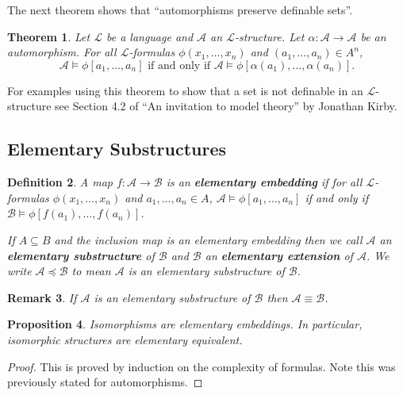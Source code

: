 \documentclass[11pt]{article}
\newtheorem{theorem}{Theorem}[section]
\newtheorem{remark}[theorem]{Remark}
\newtheorem{proposition}[theorem]{Proposition}
\newtheorem{definition}[theorem]{Definition}
\newcommand{\mcal}[1]{\mathcal{#1}}
\begin{document}
The next theorem shows that ``automorphisms preserve definable sets''.

\begin{theorem}
Let $\mcal{L}$ be a language and $\mcal{A}$ an $\mcal{L}$-structure. Let $\alpha:\mcal{A}\rightarrow\mcal{A}$ be an automorphism. For all $\mcal{L}$-formulas $\phi(x_1,\ldots,x_n)$ and $(a_1,\ldots,a_n)\in A^n$,
\[\mcal{A}\models \phi[a_1,\ldots,a_n]\text{ if and only if }\mcal{A}\models\phi[\alpha(a_1),\ldots,\alpha(a_n)].\]
\end{theorem}

For examples using this theorem to show that a set is not definable in an $\mcal{L}$-structure see Section 4.2 of ``An invitation to model theory'' by Jonathan Kirby.


\subsection{Elementary Substructures}



\begin{definition}
A map $f:\mcal{A}\rightarrow \mcal{B}$ is an \textbf{elementary embedding} if for all $\mcal{L}$-formulas $\phi(x_1,\ldots,x_n)$ and $a_1,\ldots,a_n\in A$, $\mcal{A}\models \phi[a_1,\ldots,a_n]$ if and only if $\mcal{B}\models\phi[f(a_1),\ldots,f(a_n)]$.

If $A\subseteq B$ and the inclusion map is an elementary embedding then we call $\mcal{A}$ an \textbf{elementary substructure} of $\mcal{B}$ and $\mcal{B}$ an \textbf{elementary extension} of $\mcal{A}$. We write $\mcal{A}\preceq\mcal{B}$ to mean $\mcal{A}$ is an elementary substructure of $\mcal{B}$.
\end{definition}

\begin{remark}
If $\mcal{A}$ is an elementary substructure of $\mcal{B}$ then $\mcal{A}\equiv \mcal{B}$.
\end{remark}

\begin{proposition}
Isomorphisms are elementary embeddings. In particular, isomorphic structures are elementary equivalent. 
\end{proposition}
\begin{proof}
This is proved by induction on the complexity of formulas. Note this was previously stated for automorphisms. 
\end{proof}
\end{document}
